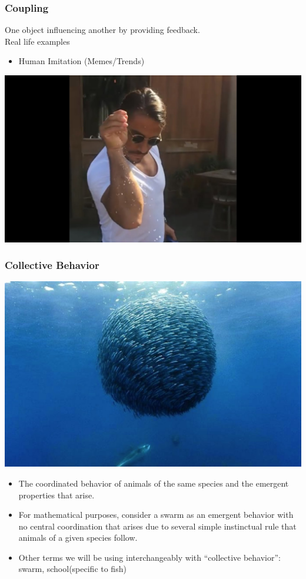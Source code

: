\documentclass[xcolor=dvipsnames]{beamer}
\begin{document}
\begin{frame}
	\frametitle{Coupling}	
	One object influencing another by providing feedback. \\
	Real life examples
	\begin{itemize}
		\item Human Imitation (Memes/Trends)
	\end{itemize}
	\begin{center}
	\includegraphics[scale=0.15]{images/salt_guy.jpg}
	\end{center}
\end{frame}

\begin{frame}
	\frametitle{Collective Behavior}
	\begin{center}
	\includegraphics[scale=0.05]{images/fish_schoo.jpg}
	\end{center}
	\begin{itemize}
		\item The coordinated behavior of animals of the same species and the emergent properties that arise.
		\pause
		\item For mathematical purposes, consider a swarm as an emergent behavior with no central coordination that arises due to several simple instinctual rule that animals of a given species follow.
		\pause
		\item Other terms we will be using interchangeably with ``collective behavior'': swarm, school(specific to fish)
	\end{itemize}
\end{frame}
\end{document}
